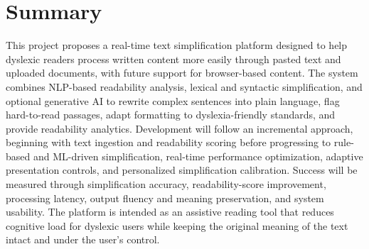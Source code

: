\documentclass[11pt,a4paper]{article}
\begin{document}
\section{Summary}

This project proposes a real-time text simplification platform designed to help dyslexic readers process written content more easily through pasted text and uploaded documents, with future support for browser-based content. The system combines NLP-based readability analysis, lexical and syntactic simplification, and optional generative AI to rewrite complex sentences into plain language, flag hard-to-read passages, adapt formatting to dyslexia-friendly standards, and provide readability analytics. Development will follow an incremental approach, beginning with text ingestion and readability scoring before progressing to rule-based and ML-driven simplification, real-time performance optimization, adaptive presentation controls, and personalized simplification calibration. Success will be measured through simplification accuracy, readability-score improvement, processing latency, output fluency and meaning preservation, and system usability. The platform is intended as an assistive reading tool that reduces cognitive load for dyslexic users while keeping the original meaning of the text intact and under the user's control.
\end{document}
